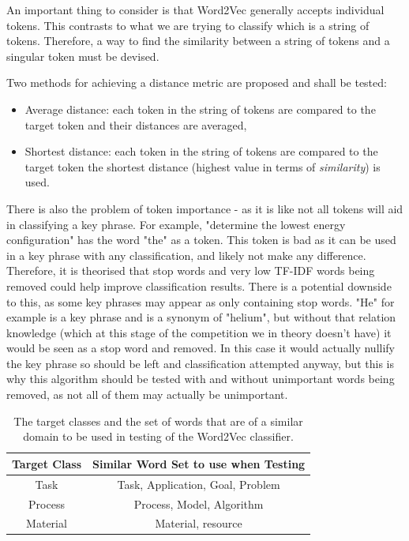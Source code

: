 An important thing to consider is that Word2Vec generally accepts individual tokens. This contrasts to what we are trying to classify which is a string of tokens. Therefore, a way to find the similarity between a string of tokens and a singular token must be devised.

Two methods for achieving a distance metric are proposed and shall be tested:
\begin{itemize}
	\item Average distance: each token in the string of tokens are compared to the target token and their distances are averaged,
	\item Shortest distance: each token in the string of tokens are compared to the target token the shortest distance (highest value in terms of \textit{similarity}) is used.
\end{itemize}

There is also the problem of token importance - as it is like not all tokens will aid in classifying a key phrase. For example, "determine the lowest energy configuration" has the word "the" as a token. This token is bad as it can be used in a key phrase with any classification, and likely not make any difference. Therefore, it is theorised that stop words and very low TF-IDF words being removed could help improve classification results. There is a potential downside to this, as some key phrases may appear as only containing stop words. "He" for example is a key phrase and is a synonym of "helium", but without that relation knowledge (which at this stage of the competition we in theory doesn't have) it would be seen as a stop word and removed. In this case it would actually nullify the key phrase so should be left and classification attempted anyway, but this is why this algorithm should be tested with and without unimportant words being removed, as not all of them may actually be unimportant.
\begin{table}
	\centering
	\begin{tabular}{ c | c }
		\textbf{Target Class} & \textbf{Similar Word Set to use when Testing} \\
		\hline
		Task & Task, Application, Goal, Problem \\
		 \hline
		Process & Process, Model, Algorithm\\
		 \hline
		Material & Material, resource \\
	\end{tabular}
	\caption[Word2Vec Classification Target Words]{The target classes and the set of words that are of a similar domain to be used in testing of the Word2Vec classifier.}
	\label{table:w2vclasswords}
\end{table}

